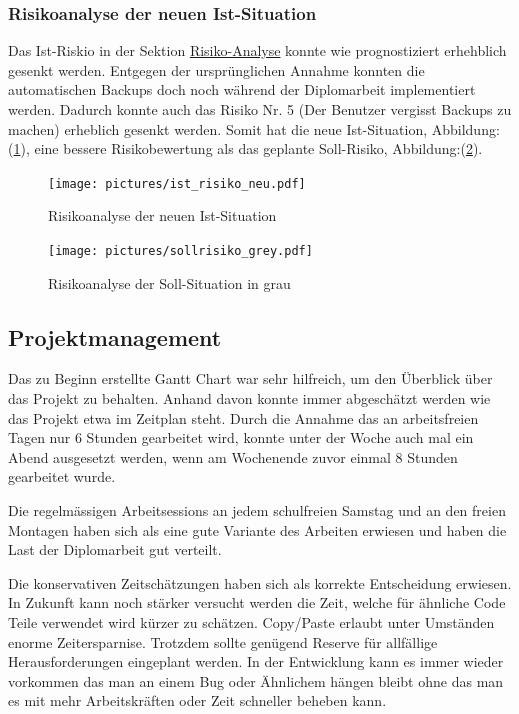 \subsubsection{Risikoanalyse der neuen Ist-Situation}
\label{sec:orgc98cda5}

Das Ist-Riskio in der Sektion \hyperref[sec:org2347925]{Risiko-Analyse} konnte
wie prognostiziert erhehblich gesenkt werden. Entgegen der ursprünglichen
Annahme konnten die automatischen Backups doch noch während der Diplomarbeit
implementiert werden. Dadurch konnte auch das Risiko Nr. 5 (Der Benutzer
vergisst Backups zu machen) erheblich gesenkt werden. Somit hat die neue
Ist-Situation, Abbildung:(\ref{fig:org47eb5a8}), eine bessere Risikobewertung
als das geplante Soll-Risiko, Abbildung:(\ref{fig:sollgrau}).

\begin{figure}[H]
\centering
\texttt{[image: pictures/ist\_risiko\_neu.pdf]}
\caption{\label{fig:org47eb5a8}
Risikoanalyse der neuen Ist-Situation}
\end{figure}

\begin{figure}[H]
\centering
\texttt{[image: pictures/sollrisiko\_grey.pdf]}
\caption{\label{fig:sollgrau}
Risikoanalyse der Soll-Situation in grau}
\end{figure}

\subsection{Projektmanagement}
\label{sec:orgb68b222}

Das zu Beginn erstellte Gantt Chart war sehr hilfreich, um den Überblick über
das Projekt zu behalten. Anhand davon konnte immer abgeschätzt werden wie das
Projekt etwa im Zeitplan steht. Durch die Annahme das an arbeitsfreien Tagen
nur 6 Stunden gearbeitet wird, konnte unter der Woche auch mal ein Abend
ausgesetzt werden, wenn am Wochenende zuvor einmal 8 Stunden gearbeitet wurde.

Die regelmässigen Arbeitsessions an jedem schulfreien Samstag und an den freien
Montagen haben sich als eine gute Variante des Arbeiten erwiesen und haben die
Last der Diplomarbeit gut verteilt.

Die konservativen Zeitschätzungen haben sich als korrekte Entscheidung
erwiesen. In Zukunft kann noch stärker versucht werden die Zeit, welche für
ähnliche Code Teile verwendet wird kürzer zu schätzen. Copy/Paste erlaubt unter
Umständen enorme Zeitersparnise. Trotzdem sollte genügend Reserve für
allfällige Herausforderungen eingeplant werden. In der Entwicklung kann es
immer wieder vorkommen das man an einem Bug oder Ähnlichem hängen bleibt ohne
das man es mit mehr Arbeitskräften oder Zeit schneller beheben kann.

